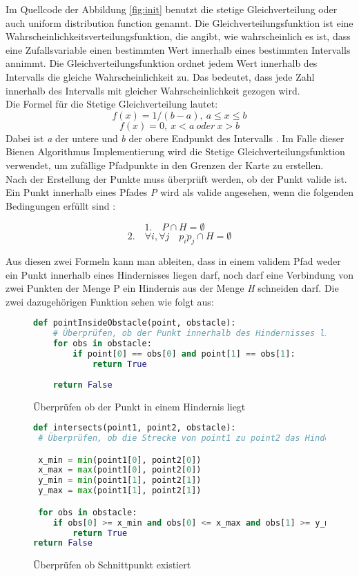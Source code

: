 Im Quellcode der Abbildung \ref{fig:init} benutzt die stetige Gleichverteilung oder auch uniform distribution function genannt. Die Gleichverteilungsfunktion ist eine Wahrscheinlichkeitsverteilungsfunktion, die angibt, wie wahrscheinlich es ist, dass eine Zufallsvariable einen bestimmten Wert innerhalb eines bestimmten Intervalls annimmt.
Die Gleichverteilungsfunktion ordnet jedem Wert innerhalb des Intervalls die gleiche Wahrscheinlichkeit zu. Das bedeutet, dass jede Zahl innerhalb des Intervalls mit gleicher Wahrscheinlichkeit gezogen wird.\\
Die Formel für die Stetige Gleichverteilung lautet:
\[f(x) = 1/(b-a),\: a \leq x \leq b\]
\[f(x) = 0,\:x < a \:oder\: x > b\]
Dabei ist \emph{a} der untere und \emph{b} der obere Endpunkt des Intervalls \cite{casella2021statistical}. Im Falle dieser Bienen Algorithmus Implementierung wird die Stetige Gleichverteilungsfunktion verwendet, um zufällige Pfadpunkte in den Grenzen der Karte zu erstellen.\\
Nach der Erstellung der Punkte muss überprüft werden, ob der Punkt valide ist. Ein Punkt innerhalb eines Pfades \emph{P} wird als valide angesehen, wenn die folgenden Bedingungen erfüllt sind \cite{Darwish2018}:

\[1. \quad P \cap H = \emptyset \quad\]
\[2. \quad \forall i, \forall j \quad \overline{p_i p_j} \cap H = \emptyset\]

Aus diesen zwei Formeln kann man ableiten, dass in einem validem Pfad weder ein Punkt innerhalb eines Hindernisses liegen darf, noch darf eine Verbindung von zwei Punkten der Menge P ein Hindernis aus der Menge \emph{H} schneiden darf.
Die zwei dazugehörigen Funktion sehen wie folgt aus:


\begin{figure}[H]
    \centering
        \begin{lstlisting}[language=python]
def pointInsideObstacle(point, obstacle):
    # Überprüfen, ob der Punkt innerhalb des Hindernisses liegt
    for obs in obstacle:
        if point[0] == obs[0] and point[1] == obs[1]:
            return True
                
    return False
            \end{lstlisting}
    \caption{Überprüfen ob der Punkt in einem Hindernis liegt}
      \label{fig:pointInsideObstacle}
\end{figure}

\begin{figure}[H]
    \begin{lstlisting}[language=python]
def intersects(point1, point2, obstacle):
 # Überprüfen, ob die Strecke von point1 zu point2 das Hindernis schneidet

 x_min = min(point1[0], point2[0])
 x_max = max(point1[0], point2[0])
 y_min = min(point1[1], point2[1])
 y_max = max(point1[1], point2[1])

 for obs in obstacle:
    if obs[0] >= x_min and obs[0] <= x_max and obs[1] >= y_min and obs[1] <= y_max:
        return True
return False
    \end{lstlisting}
    \caption{Überprüfen ob Schnittpunkt existiert}
\end{figure}

